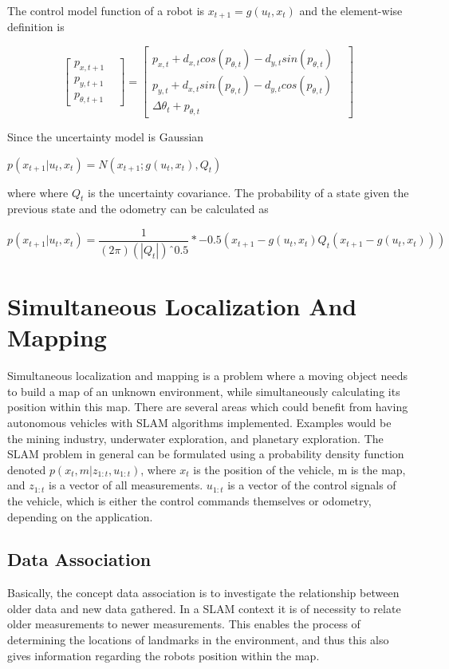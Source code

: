 The control model function of a robot is
$x_{t+1} = g(u_{t},x_{t})$
and the element-wise definition is

\[
\begin{bmatrix}
    p_{x,t+1}       & \\
    p_{y,t+1}       & \\
    p_{\theta,t+1} 
\end{bmatrix}
=
\begin{bmatrix}
    p_{x,t} + d_{x,t}cos(p_{\theta,t}) - d_{y,t}sin(p_{\theta,t}) & \\
    p_{y,t} + d_{x,t}sin(p_{\theta,t}) - d_{y,t}cos(p_{\theta,t}) & \\
    \Delta \theta_{t} + p_{\theta,t} 
\end{bmatrix}
\]

Since the uncertainty model is Gaussian

$p(x_{t+1}|u_{t}, x_{t}) = N(x_{t+1};g(u_{t}, x_{t}), Q_{t})$

where where $Q_{t}$ is the uncertainty covariance. The probability of a state given the previous state and the odometry can be calculated as

\[ p(x_{t+1}|u_{t}, x_{t}) = \frac{1}{(2\pi)(|Q_{t}|)ˆ0.5}  *  -0.5(x_{t+1} - g(u_{t}, x_{t}) Q_{t}( x_{t+1} - g(u_{t}, x_{t}) ))\]

\section{Simultaneous Localization And Mapping}
Simultaneous localization and mapping is a problem where a moving object needs to build a map of an unknown environment, while simultaneously calculating its position within this map. \cite{gamini2001}
There are several areas which could benefit from having autonomous vehicles with SLAM algorithms implemented. Examples would be the mining industry, underwater exploration, and planetary exploration.\cite{gamini2001} The SLAM problem in general can be formulated using a probability density function denoted $p(x_{t} , m|z_{1:t} , u_{1:t} )$, where $x_{t}$ is the position of the vehicle, m is the map, and $z_{1:t}$ is a vector of all measurements. $u_{1:t}$ is a vector of the control signals of the vehicle, which is either the control commands themselves or odometry, depending on the application.

\subsection{Data Association}
Basically, the concept data association is to investigate the relationship between older data and new data gathered. In a SLAM context it is of necessity to relate older measurements to newer measurements. This enables the process of determining the locations of landmarks in the environment, and thus this also gives information regarding the robots position within the map. \cite{mit2017}

